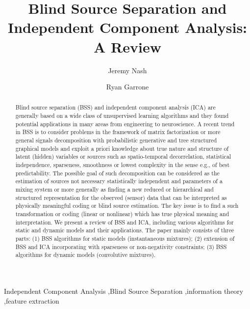 \documentclass[5p]{elsarticle}
\begin{document}
\begin{frontmatter}

\title{Blind Source Separation and Independent Component Analysis: A Review}
\author[jpl]{Jeremy Nash} %

\author[jpl]{Ryan Garrone}

\address[jpl]{Electrical Engineering Division, University of Michigan, Ann Arbor, MI 48109}

\begin{abstract}

Blind source separation (BSS) and independent component analysis (ICA) are generally based on a wide class of unsupervised learning algorithms and they found potential applications in many areas from engineering to neuroscience. A recent trend in BSS is to consider problems in the framework of matrix factorization or more general signals decomposition with probabilistic generative and tree structured graphical models and exploit a priori knowledge about true nature and structure of latent (hidden) variables or sources such as spatio-temporal decorrelation, statistical independence, sparseness, smoothness or lowest complexity in the sense e.g., of best predictability. The possible goal of such decomposition can be considered as the estimation of sources not necessary statistically independent and parameters of a mixing system or more generally as finding a new reduced or hierarchical and structured representation for the observed (sensor) data that can be interpreted as physically meaningful coding or blind source estimation. The key issue is to find a such transformation or coding (linear or nonlinear) which has true physical meaning and interpretation. We present a review of BSS and ICA, including various algorithms for static and dynamic models and their applications. The paper mainly consists of three parts: (1) BSS algorithms for static models (instantaneous mixtures); (2) extension of BSS and ICA incorporating with sparseness or non-negativity constraints; (3) BSS algorithms for dynamic models (convolutive mixtures).

\end{abstract}
\begin{keyword}
Independent Component Analysis \sep Blind Source Separation \sep information theory \sep feature extraction
\end{keyword}
\end{frontmatter}
\end{document}
